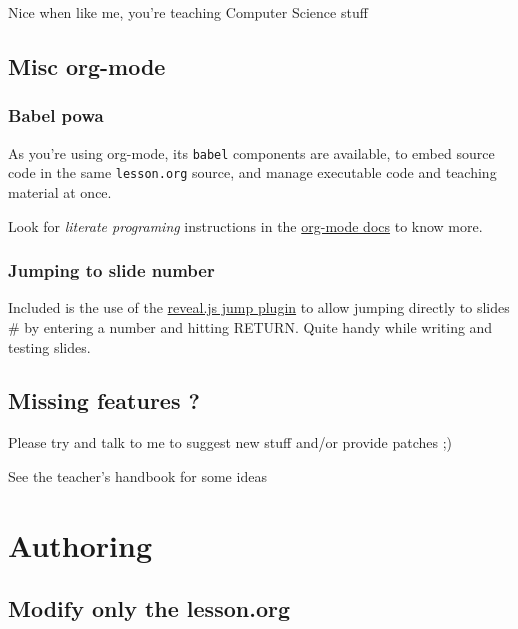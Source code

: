 \documentclass[a4paper]{article}
\begin{document}
\begin{NOTES}
Nice when like me, you're teaching Computer Science stuff
\end{NOTES}

\subsection{Misc org-mode}
\label{sec:org11ad7b1}

\subsubsection{Babel powa}
\label{sec:org5a63085}
As you're using org-mode, its \texttt{babel} components are available, to embed source code in the same \texttt{lesson.org} source, and manage executable code and teaching material at once.

Look for \emph{literate programing} instructions in the \href{http://orgmode.org/manual/Working-with-source-code.html}{org-mode docs} to know more.

\subsubsection{Jumping to slide number}
\label{sec:orgb7ceef8}

Included is the use of the
\href{https://github.com/SethosII/reveal.js-jump-plugin}{reveal.js jump
plugin} to allow jumping directly to slides \# by entering a number
and hitting RETURN. Quite handy while writing and testing slides.

\subsection{Missing features ?}
\label{sec:org57af755}

Please try and talk to me to suggest new stuff and/or provide patches ;)

\begin{NOTES}
See the teacher's handbook for some ideas
\end{NOTES}

\section{Authoring}
\label{sec:org7fda179}
\subsection{Modify only the lesson.org}
\label{sec:orge56b485}
\end{document}
